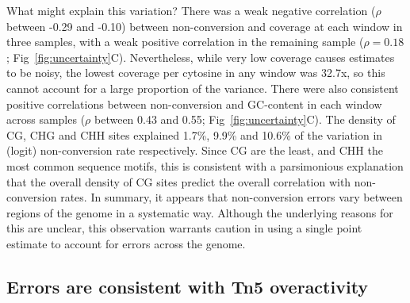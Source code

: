 \documentclass[10pt,letterpaper,draft]{article}
\begin{document}
What might explain this variation?
There was a weak negative correlation ($\rho$ between -0.29 and -0.10) between non-conversion and coverage at each window in three samples, with a weak positive correlation in the remaining sample ($\rho = 0.18$; Fig~\ref{fig:uncertainty}C).
Nevertheless, while very low coverage causes estimates to be noisy, the lowest coverage per cytosine in any window was 32.7x, so this cannot account for a large proportion of the variance.
There were also consistent positive correlations between non-conversion and GC-content in each window across samples ($\rho$ between 0.43 and 0.55; Fig~\ref{fig:uncertainty}C).
The density of CG, CHG and CHH sites explained 1.7\%, 9.9\% and 10.6\% of the variation in (logit) non-conversion rate respectively.
Since CG are the least, and CHH the most common sequence motifs, this is consistent with a parsimonious explanation that the overall density of CG sites predict the overall correlation with non-conversion rates.
In summary, it appears that non-conversion errors vary between regions of the genome in a systematic way.
Although the underlying reasons for this are unclear, this observation warrants caution in using a single point estimate to account for errors across the genome.

\subsection*{Errors are consistent with Tn5 overactivity}
\end{document}
